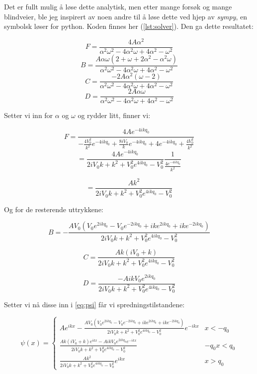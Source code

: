 \documentclass[a4paper,norsk, 10pt]{article}
\numberwithin{equation}{section}
\begin{document}
Det er fullt mulig å løse dette analytisk, men etter mange forsøk og mange blindveier, ble jeg inspirert av noen andre til å løse dette ved hjep av \textit{sympy}, en symbolsk løser for python. Koden finnes her (\ref{lst:solver}). Den ga dette resultatet:

$$
F = \frac{4A\alpha^2}{\alpha^2\omega^2 - 4\alpha^2\omega + 4\alpha^2 - \omega^2}
$$
$$
B = \frac{A\alpha\omega(2+\omega +2\alpha^2 - \alpha^2\omega)}{\alpha^2\omega^2 - 4\alpha^2\omega + 4\alpha^2 - \omega^2}
$$
$$
C = \frac{-2A\alpha^2(\omega - 2)}{\alpha^2\omega^2 - 4\alpha^2\omega + 4\alpha^2 - \omega^2}
$$
$$
D = \frac{2A\alpha\omega}{\alpha^2\omega^2 - 4\alpha^2\omega + 4\alpha^2 - \omega^2}
$$

Setter vi inn for $\alpha$ og $\omega$ og rydder litt, finner vi:

$$
F = \frac{4Ae^{-4ikq_0}}{-\frac{4V_0^2}{k^2}e^{-4ikq_0} + \frac{8iV_0}{k}e^{-4ikq_0} + 4e^{-4ikq_0} + \frac{4V_0^2}{k^2}}
$$
$$
= \frac{4Ae^{-4ikq_0}}{2iV_0k + k^2 +V_0^2e^{4ikq_0} - V_0^2}\frac{1}{\frac{4e^{-4ikq_0}}{k^2}}
$$

\begin{equation}
= \frac{Ak^2}{2iV_0k + k^2 +V_0^2e^{4ikq_0} - V_0^2}
\label{eq:F}
\end{equation}

Og for de resterende uttrykkene:

\begin{equation}
B = -\frac{AV_0\left(V_0e^{2ikq_0} - V_0e^{-2ikq_0} + ike^{2ikq_0} + ike^{-2ikq_0}\right)}{2iV_0k + k^2 +V_0^2e^{4ikq_0} - V_0^2}
\label{eq:B}
\end{equation}

\begin{equation}
C = \frac{Ak(iV_0 + k)}{2iV_0k + k^2 +V_0^2e^{4ikq_0} - V_0^2}
\label{eq:C}
\end{equation}

\begin{equation}
D = \frac{-AikV_0e^{2ikq_0}}{2iV_0k + k^2 +V_0^2e^{4ikq_0} - V_0^2}
\label{eq:D}
\end{equation}

Setter vi nå disse inn i \eqref{eq:psi} får vi spredningstilstandene:

\begin{equation}
\psi(x) =
\begin{cases}
Ae^{ikx} -\frac{AV_0\left(V_0e^{2ikq_0} - V_0e^{-2ikq_0} + ike^{2ikq_0} + ike^{-2ikq_0}\right)}{2iV_0k + k^2 +V_0^2e^{4ikq_0} - V_0^2}e^{-ikx} & x< -q_0 \\
\frac{Ak(iV_0 + k)e^{ikx} -AikV_0e^{2ikq_0}e^{-ikx}}{2iV_0k + k^2 +V_0^2e^{4ikq_0} - V_0^2} & -q_0x< q_0 \\
\frac{Ak^2}{2iV_0k + k^2 +V_0^2e^{4ikq_0} - V_0^2}e^{ikx} & x>q_0 
\end{cases}
\end{equation}
\end{document}
